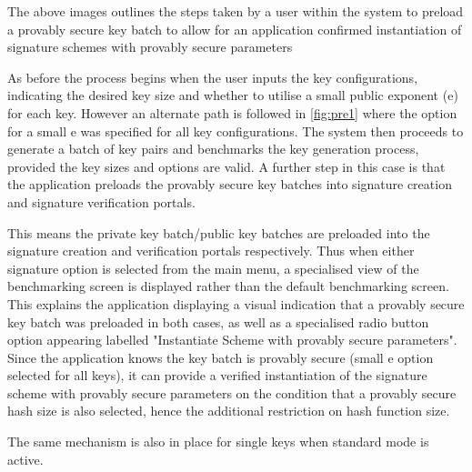 \documentclass[]{final_report}
\begin{document}
The above images outlines the steps taken by a user within the system to preload a provably secure key batch to allow for an application confirmed instantiation of signature schemes with provably secure parameters



As before the process begins when the user inputs the key configurations, indicating the desired key size and whether to utilise a small public exponent (e) for each key. However an alternate path is followed in \ref{fig:pre1} where the option for a small e was specified for all key configurations. The system then proceeds to generate a batch of key pairs and benchmarks the key generation process, provided the key sizes and options are valid. A further step in this case is that the application preloads the provably secure key batches into signature creation and signature verification portals.



This means the private key batch/public key batches are preloaded into the signature creation and verification portals respectively. Thus when either signature option is selected from the main menu, a specialised view of the benchmarking screen is displayed rather than the default benchmarking screen.
This explains the application displaying a visual indication that a provably secure key batch was preloaded in both cases, as well as a specialised radio button option appearing labelled "Instantiate Scheme with provably secure parameters". Since the application knows the key batch is provably secure (small e option selected for all keys), it can provide a verified instantiation of the signature scheme with provably secure parameters on the condition that a provably secure hash size is also selected, hence the additional restriction on hash function size.  

The same mechanism is also in place for single keys when standard mode is active.
\end{document}
